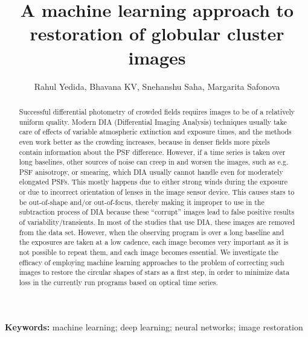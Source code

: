 \documentclass[12pt,a4paper]{article}
\title{A machine learning approach to restoration of globular cluster images}
\author{Rahul Yedida, Bhavana KV, Snehanshu Saha, Margarita Safonova}
\date{}
\begin{document}
\maketitle
\begin{abstract}
Successful differential photometry of crowded fields requires images to be of a relatively uniform quality. Modern DIA (Differential Imaging Analysis) techniques usually take care of effects of variable atmospheric extinction and exposure times, and the methods even work better as the crowding increases, because in denser fields more pixels contain information about the PSF difference. However, if a time series is taken over long baselines, other sources of noise can creep in and worsen the images, such as e.g. PSF anisotropy, or smearing, which DIA usually cannot handle even for moderately elongated PSFs. This mostly happens due to either strong winds during the exposure or due to incorrect orientation of lenses in the image sensor device. This causes stars to be out-of-shape and/or out-of-focus, thereby making it improper to use in the subtraction process of DIA because these “corrupt” images lead to false positive results of variability/transients. In most of the studies that use DIA, these images are removed from the data set. However, when the observing program is over a long baseline and the exposures are taken at a low cadence, each image becomes very important as it is not possible to repeat them, and each image becomes essential. We investigate the efficacy of employing machine learning approaches to the problem of correcting such images to restore the circular shapes of stars as a first step, in order to minimize data loss in the currently run programs based on optical time series.
\end{abstract}
\textbf{Keywords:} machine learning; deep learning; neural networks; image restoration
\end{document}
